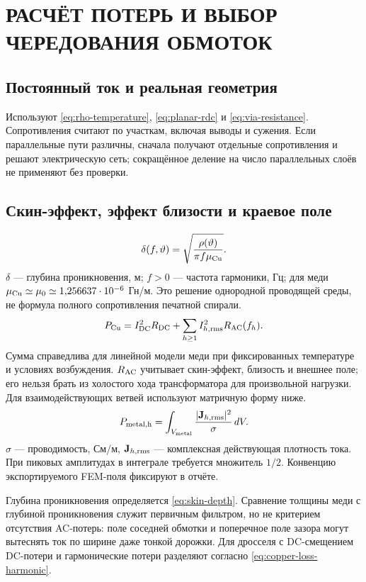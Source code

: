 \documentclass[14pt,a4paper]{extarticle}
\begin{document}
\section{РАСЧЁТ ПОТЕРЬ И ВЫБОР ЧЕРЕДОВАНИЯ ОБМОТОК}
\label{pl:losses}
\subsection{Постоянный ток и реальная геометрия}
Используют \eqref{eq:rho-temperature}, \eqref{eq:planar-rdc} и \eqref{eq:via-resistance}. Сопротивления считают по участкам, включая выводы и сужения. Если параллельные пути различны, сначала получают отдельные сопротивления и решают электрическую сеть; сокращённое деление на число параллельных слоёв не применяют без проверки.

\subsection{Скин-эффект, эффект близости и краевое поле}

\begin{equation}
 \delta(f,\vartheta)=\sqrt{\frac{\rho(\vartheta)}{\pi f\mu_{\rm Cu}}}.
 \label{eq:skin-depth}
\end{equation}
$\delta$ --- глубина проникновения, м; $f>0$ --- частота гармоники, Гц; для меди $\mu_{\rm Cu}\simeq\mu_0\simeq1{,}256637\cdot10^{-6}$ Гн/м. Это решение однородной проводящей среды, не формула полного сопротивления печатной спирали.
\begin{equation}
 P_{\rm Cu}=I_{\rm DC}^2R_{\rm DC}+\sum_{h\geq1}I_{h,\rm rms}^2R_{\rm AC}(f_h).
 \label{eq:copper-loss-harmonic}
\end{equation}
Сумма справедлива для линейной модели меди при фиксированных температуре и условиях возбуждения. $R_{\rm AC}$ учитывает скин-эффект, близость и внешнее поле; его нельзя брать из холостого хода трансформатора для произвольной нагрузки. Для взаимодействующих ветвей используют матричную форму ниже.
\begin{equation}
 P_{\rm metal,h}=\int_{V_{\rm metal}}\frac{|\mathbf J_{h,\rm rms}|^2}{\sigma}\,dV.
 \label{eq:metal-eddy-loss}
\end{equation}
$\sigma$ --- проводимость, См/м, $\mathbf J_{h,\rm rms}$ --- комплексная действующая плотность тока. При пиковых амплитудах в интеграле требуется множитель $1/2$. Конвенцию экспортируемого FEM-поля фиксируют в отчёте.

Глубина проникновения определяется \eqref{eq:skin-depth}. Сравнение толщины меди с глубиной проникновения служит первичным фильтром, но не критерием отсутствия AC-потерь: поле соседней обмотки и поперечное поле зазора могут вытеснять ток по ширине даже тонкой дорожки. Для дросселя с DC-смещением DC-потери и гармонические потери разделяют согласно \eqref{eq:copper-loss-harmonic}.\cite{web2,schaefer,ewaldfoil}
\end{document}
